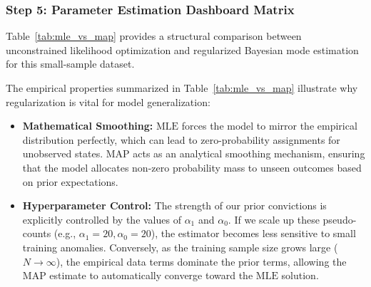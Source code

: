 \documentclass{article}
\begin{document}
\subsubsection{Step 5: Parameter Estimation Dashboard Matrix}
Table~\ref{tab:mle_vs_map} provides a structural comparison between unconstrained likelihood optimization and regularized Bayesian mode estimation for this small-sample dataset.

\begin{table}[htbp]
\centering
\small
{}
\caption{Comparative Analysis of Estimation Performance Under Small-Sample Asymmetry}
\label{tab:mle_vs_map}
\end{table}

The empirical properties summarized in Table~\ref{tab:mle_vs_map} illustrate why regularization is vital for model generalization:
\begin{itemize}
    \item \textbf{Mathematical Smoothing:} $\text{MLE}$ forces the model to mirror the empirical distribution perfectly, which can lead to zero-probability assignments for unobserved states. $\text{MAP}$ acts as an analytical smoothing mechanism, ensuring that the model allocates non-zero probability mass to unseen outcomes based on prior expectations.
    \item \textbf{Hyperparameter Control:} The strength of our prior convictions is explicitly controlled by the values of $\alpha_1$ and $\alpha_0$. If we scale up these pseudo-counts (e.g., $\alpha_1 = 20, \alpha_0 = 20$), the estimator becomes less sensitive to small training anomalies. Conversely, as the training sample size grows large ($N \to \infty$), the empirical data terms dominate the prior terms, allowing the $\text{MAP}$ estimate to automatically converge toward the $\text{MLE}$ solution.
\end{itemize}
\end{document}

